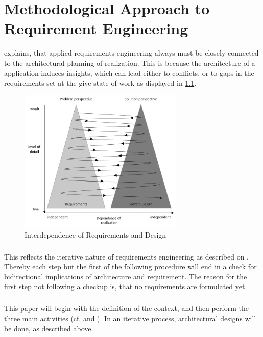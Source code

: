 \chapter{Methodological Approach to Requirement Engineering}
\textcite[22-23]{Pohl.2007} explains, that applied requirements engineering always must be closely connected to the architectural planning of realization. This is because the architecture of a application induces insights, which can lead either to conflicts, or to gaps in the requirements set at the give state of work \parencites[22-23]{Pohl.2007} as displayed in \cref{fig:iterative}. 

\begin{figure}[H]
    \centering
    \includegraphics[width=0.7\textwidth]{img/iterative.png}
    \caption[Interdependence of Requirements and Design]{Interdependence of Requirements and Design \parencite[23]{Pohl.2007}}
    \label{fig:iterative}
\end{figure}

\paragraph{} This reflects the iterative nature of requirements engineering as described on . Thereby each step but the first of the following procedure will end in a check for bidirectional implications of architecture and requirement. The reason for the first step not following a checkup is, that no requirements are formulated yet. 


\paragraph{} This paper will begin with the definition of the context, and then perform the three main activities (cf.  and ). In an iterative process, architectural designs will be done, as described above. 


